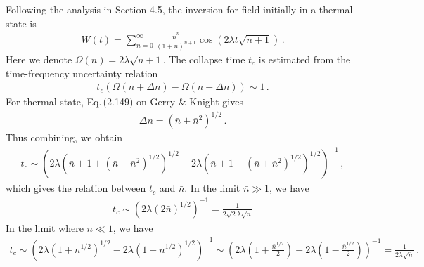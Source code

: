 \documentclass[11pt, oneside]{book}
\theoremstyle{break}
\theoremstyle{break}
\begin{document}
\chapter{}
Following the analysis in Section 4.5, the inversion for field initially in a thermal state is 
\begin{align*}
W(t) = \sum_{n=0}^\infty \frac{\bar{n}^n}{(1+\bar{n})^{n+1}}  \cos(2\lambda t \sqrt{n+1})\,.
\end{align*}
Here we denote $\Omega(n) = 2\lambda \sqrt{n+1}$. The collapse time $t_c$ is estimated from the time-frequency uncertainty relation
\begin{align*}
t_c \left(\Omega(\bar{n} + \Delta n) - \Omega (\bar{n} - \Delta n)\right) \sim	 1\,.
\end{align*}
For thermal state, Eq.\,(2.149) on Gerry \& Knight gives
\begin{align*}
\Delta n = (\bar{n} + \bar{n}^2)^{1/2}\,.
\end{align*}
Thus combining, we obtain
\begin{align*}
t_c \sim \left( 
2\lambda \left(\bar{n}+1 + ( \bar{n}+\bar{n}^2 )^{1/2}\right)^{1/2} - 2\lambda \left(\bar{n}+1 - ( \bar{n}+\bar{n}^2 )^{1/2}\right)^{1/2}
\right)^{-1}\,,
\end{align*}
which gives the relation between $t_c$ and $\bar{n}$. In  the limit $\bar{n} \gg 1$, we have
\begin{align*}
t_c \sim 
\left( 
2\lambda \left(2\bar{n}\right)^{1/2} 
\right)^{-1} = \frac{1}{2\sqrt{2}\lambda \sqrt{\bar{n}}}
\end{align*}
In the limit where $\bar{n}\ll 1$, we have
\begin{align*}
t_c \sim
\left( 
2\lambda \left(1 +\bar{n}^{1/2} \right)^{1/2} - 2\lambda \left(1 - \bar{n}^{1/2}\right)^{1/2}
\right)^{-1} 
\sim
\left( 
2\lambda \left(1 + \frac{\bar{n}^{1/2}}{2} \right) - 2\lambda \left(1 - \frac{\bar{n}^{1/2}}{2}\right)
\right)^{-1} = \frac{1}{2\lambda \sqrt{\bar{n}}}\,.
\end{align*}
\end{document}
